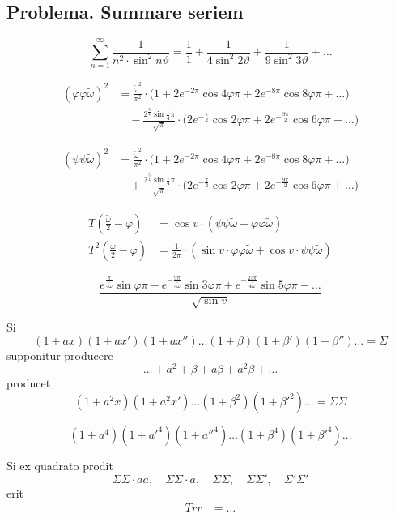 \documentclass[10pt,a4paper]{article}
\begin{document}
\subsection*{Problema. Summare seriem}

\[
\sum_{n=1}^{\infty} \frac{1}{n^2\cdot\sin^2 n\vartheta} = \frac{1}{1} + \frac{1}{4\sin^2 2\vartheta} + \frac{1}{9\sin^2 3\vartheta} + \ldots
\]

\begin{align*}
(\varphi\varphi\tilde{\omega})^2 &= \frac{\tilde{\omega}^2}{\pi^2}\cdot\bigl(1+2e^{-2\pi}\cos 4\varphi\pi+2e^{-8\pi}\cos 8\varphi\pi+\ldots\bigr)\\
&\quad - \frac{2^{\frac54}\sin\tfrac14\pi}{\sqrt{\pi}}\cdot\bigl(2e^{-\frac{\pi}{2}}\cos 2\varphi\pi+2e^{-\frac{9\pi}{2}}\cos 6\varphi\pi+\ldots\bigr)
\end{align*}

\begin{align*}
(\psi\psi\tilde{\omega})^2 &= \frac{\tilde{\omega}^2}{\pi^2}\cdot\bigl(1+2e^{-2\pi}\cos 4\varphi\pi+2e^{-8\pi}\cos 8\varphi\pi+\ldots\bigr)\\
&\quad + \frac{2^{\frac54}\sin\tfrac14\pi}{\sqrt{\pi}}\cdot\bigl(2e^{-\frac{\pi}{2}}\cos 2\varphi\pi+2e^{-\frac{9\pi}{2}}\cos 6\varphi\pi+\ldots\bigr)
\end{align*}

\begin{align*}
T(\tfrac{\tilde{\omega}}{2}-\varphi) &= \cos v\cdot(\psi\psi\tilde{\omega} - \varphi\varphi\tilde{\omega})\\
T^2(\tfrac{\tilde{\omega}}{2}-\varphi) &= \tfrac{1}{2\pi}\cdot(\sin v\cdot\varphi\varphi\tilde{\omega} + \cos v\cdot\psi\psi\tilde{\omega})
\end{align*}

\[
\frac{e^{\frac{\pi}{4\tilde{\omega}}}\sin\varphi\pi - e^{-\frac{9\pi}{4\tilde{\omega}}}\sin 3\varphi\pi + e^{-\frac{25\pi}{4\tilde{\omega}}}\sin 5\varphi\pi - \ldots}{\sqrt{\sin v}}
\]

Si
\[
(1+ax)(1+ax')(1+ax'')\ldots(1+\beta)(1+\beta')(1+\beta'')\ldots = \Sigma
\]
supponitur producere
\[
\ldots + a^2 + \beta + a\beta + a^2\beta + \ldots
\]
producet
\[
(1+a^2x)(1+a^2x')\ldots(1+\beta^2)(1+\beta'^2)\ldots = \Sigma\Sigma
\]

\[
(1+a^4)(1+a'^4)(1+a''^4)\ldots(1+\beta^4)(1+\beta'^4)\ldots
\]

Si ex quadrato prodit
\[
\Sigma\Sigma \cdot aa, \quad \Sigma\Sigma \cdot a, \quad \Sigma\Sigma, \quad \Sigma\Sigma', \quad \Sigma'\Sigma'
\]
erit
\begin{align*}
Trr &= \ldots
\end{align*}
\end{document}

